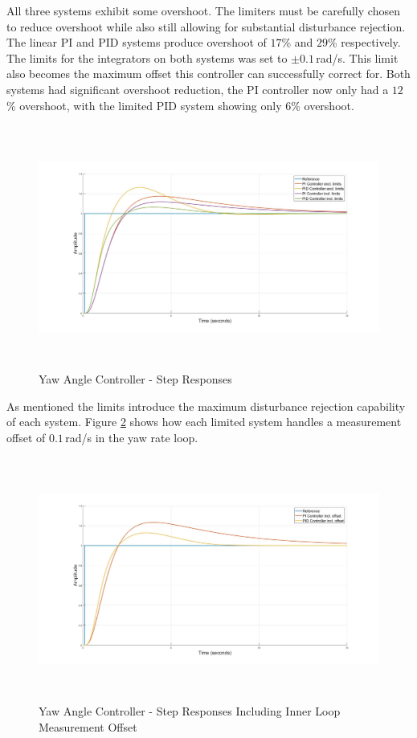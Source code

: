 \documentclass[12pt]{report}
\begin{document}
All three systems exhibit some overshoot. The limiters must be carefully chosen to reduce overshoot while also still allowing for substantial disturbance rejection. The linear PI and PID systems produce overshoot of $17$\% and $29$\% respectively. The limits for the integrators on both systems was set to $\pm 0.1$\,rad/s. This limit also becomes the maximum offset this controller can successfully correct for. Both systems had significant overshoot reduction, the PI controller now only had a $12$\% overshoot, with the limited PID system showing only $6$\% overshoot. 

\begin{figure}[H]
	\centering
	\includegraphics[height = 8cm]{../Design/Matlab/Controllers/yaw_angle_step_both_limits.jpg}
	\caption{Yaw Angle Controller -  Step Responses}
	\label{IM_YawAngleStep}
\end{figure}

As mentioned the limits introduce the maximum disturbance rejection capability of each system. Figure \ref{IM_YawAngleStepBoth} shows how each limited system handles a measurement offset of $0.1$\,rad/s in the yaw rate loop.

\begin{figure}[H]
	\centering
	\includegraphics[height = 8cm]{../Design/Matlab/Controllers/yaw_angle_step_both_dist.jpg}
	\caption{Yaw Angle Controller -  Step Responses Including Inner Loop Measurement Offset}
	\label{IM_YawAngleStepBoth}
\end{figure}
\end{document}
